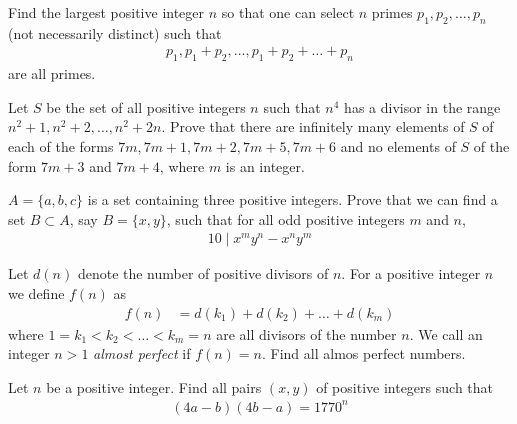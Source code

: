 \begin{problem}
	Find the largest positive integer $n$ so that one can select $n$ primes $p_1, p_2, \dots, p_n$ (not necessarily distinct) such that
	\begin{align*}
		p_1, p_1+p_2, \dots, p_1+p_2+\dots+p_n
	\end{align*}
	are all primes.
\end{problem}

\begin{problem}
	Let $S$ be the set of all positive integers $n$ such that $n^4$ has a divisor in the range $n^2 +1, n^2 + 2,\dots,n^2 + 2n$. Prove that there are infinitely many elements of $S$ of each of the forms $7m, 7m+1, 7m+2, 7m+5, 7m+6$ and no elements of $S$ of the form $7m+3$ and $7m+4$, where $m$ is an integer. %
\end{problem}

\begin{problem}
	$A=\{a,b,c\}$ is a set containing three positive integers. Prove that we can find a set $B \subset A$, say $B=\{x,y\}$, such that for all odd positive integers $m$ and $n$,
	\begin{align*}
		10 \mid x^m y^n - x^n y^m
	\end{align*}
\end{problem}

\begin{problem}
	Let $d(n)$ denote the number of positive divisors of $n$. For a positive integer $n$ we define $f(n)$ as
	\begin{align*}
		f(n) & = d(k_1) + d(k_2) + \ldots + d(k_m)
	\end{align*}
	where $ 1=k_1 < k_2 < \ldots < k_m=n$ are all divisors of the number $n$. We call an integer $n>1$ \textit{almost perfect} if $f(n)=n$. Find all almos perfect numbers.
\end{problem}

\begin{problem}
	Let $n$ be a positive integer. Find all pairs $(x,y)$ of positive integers such that
	\begin{align*}
		(4a-b)(4b-a)=1770^n
	\end{align*}
\end{problem}

